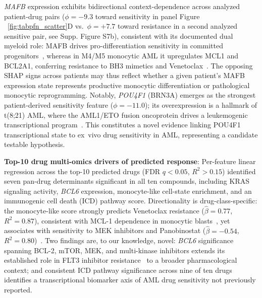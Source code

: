 \documentclass[pdflatex,sn-mathphys-num]{sn-jnl}
\theoremstyle{thmstyleone}
\theoremstyle{thmstyletwo}
\theoremstyle{thmstylethree}
\begin{document}
\textit{MAFB} expression exhibits bidirectional context-dependence across analyzed patient-drug pairs ($\phi = -9.3$ toward sensitivity in panel Figure ~\ref{fig:tabpfn_scatter}D vs.\ $\phi = +7.7$ toward resistance in a second analyzed sensitive pair, see Supp. Figure S7b), consistent with its documented dual myeloid role: MAFB drives pro-differentiation sensitivity in committed progenitors~\cite{ventura2025mafb}, whereas in M4/M5 monocytic AML it upregulates MCL1 and BCL2A1, conferring resistance to BH3 mimetics and Venetoclax~\cite{allen2025venetoclax}. The opposing SHAP signs across patients may thus reflect whether a given patient's MAFB expression state represents productive monocytic differentiation or pathological monocytic reprogramming. Notably, \textit{POU4F1} (BRN3A) emerges as the strongest patient-derived sensitivity feature ($\phi = -11.0$); its overexpression is a hallmark of t(8;21) AML, where the AML1/ETO fusion oncoprotein drives a leukemogenic transcriptional program~\cite{dunne2010pou4f1, fortier2010pou4f1}. This constitutes a novel evidence linking POU4F1 transcriptional state to ex~vivo drug sensitivity in AML, representing a candidate testable hypothesis. %

\textbf{Top-10 drug multi-omics drivers of predicted response}: Per-feature linear regression across the top-10 predicted drugs (FDR $q < 0.05$, $R^2 > 0.15$) identified seven pan-drug determinants significant in all ten compounds, including KRAS signaling activity, \textit{BCL6} expression, monocyte-like cell-state enrichment, and an immunogenic cell death (ICD) pathway score. Directionality is drug-class-specific: the monocyte-like score strongly predicts Venetoclax resistance ($\hat{\beta} = 0.77$, $R^2 = 0.87$), consistent with MCL-1 dependence in monocytic blasts~\cite{kennedy2026ras, mohanty2024venetoclax, allen2025venetoclax}, yet associates with sensitivity to MEK inhibitors and Panobinostat ($\hat{\beta} = -0.54$, $R^2 = 0.80$)~\cite{pedicona2022lsd1, burgess2017kras}. Two findings are, to our knowledge, novel: \textit{BCL6} significance spanning BCL-2, mTOR, MEK, and multi-kinase inhibitors extends its established role in FLT3 inhibitor resistance~\cite{zavorka2021bcl6} to a broader pharmacological context; and consistent ICD pathway significance across nine of ten drugs identifies a transcriptional biomarker axis of AML drug sensitivity not previously reported.
\end{document}
